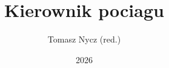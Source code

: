 \title[Przygotowanie zawodowe, Staż stanowiskowy, Szkolenie teoretyczne]{Kierownik pociagu}
\author{Tomasz Nycz (red.)}
\date{2026}

